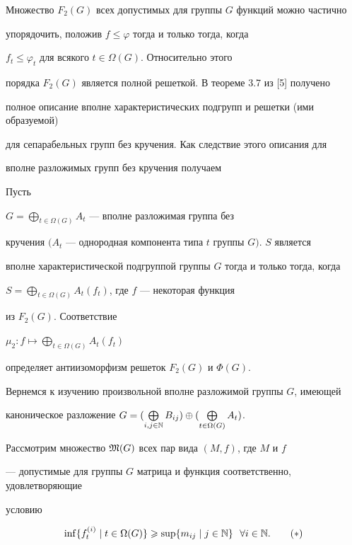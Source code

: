 Множество $F_2(G)$ всех допустимых для группы $G$ функций можно частично


упорядочить, положив $f\leqslant\varphi$ тогда и только тогда, когда


$f_t\leqslant\varphi_t$ для всякого $t\in\Omega (G)$. Относительно этого


порядка $F_2(G)$ является полной решеткой. В теореме 3.7 из [5] получено


полное описание вполне характеристических подгрупп и решетки (ими образуемой)


для сепарабельных групп без кручения. Как следствие этого описания для


вполне разложимых групп без кручения получаем





\begin{prop}


Пусть


$G=\bigoplus\limits_{t\in\Omega(G)}A_t$ --- вполне разложимая группа без


кручения $(A_t$ --- однородная компонента типа $t$ группы $G)$. $S$ является


вполне характеристической подгруппой группы $G$ тогда и только тогда, когда


$S=\bigoplus\limits_{t\in\Omega(G)}A_t(f_t)$, где $f$ --- некоторая функция


из $F_2(G)$. Соответствие


$\mu_2:f\longmapsto\bigoplus\limits_{t\in\Omega(G)}A_t(f_t)$


определяет антиизоморфизм решеток $F_2(G)$ и $\Phi(G)$.


\end{prop}





Вернемся к изучению произвольной вполне разложимой группы $G$, имеющей


каноническое разложение $G=(\bigoplus\limits_{i,j\in\Bbb N}B_{ij})\oplus


(\bigoplus\limits_{t\in\Omega(G)}A_t)$.


Рассмотрим множество $\frak M(G)$ всех пар вида $(M, f)$, где $M$ и $f$


--- допустимые для группы $G$ матрица и функция соответственно, удовлетворяющие


условию


\begin{equation}


\inf\{f_t^{(i)}\mid t\in\Omega(G)\}\geqslant\sup\{m_{ij}\mid j\in\Bbb N\}


\ \ \forall i\in\Bbb N.


\tag{$\ast$}


\end{equation}





